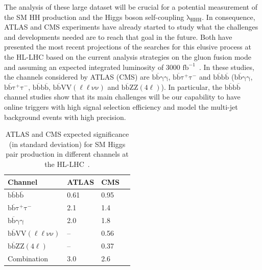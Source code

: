 The analysis of these large dataset will be crucial for a potential measurement of the SM HH production and the Higgs boson self-coupling $\mathrm{\lambda_{HHH}}$. In consequence, ATLAS and CMS experiments have already started to study what the challenges and developments needed are to reach that goal in the future. Both have presented the most recent projections of the searches for this elusive process at the HL-LHC based on the current analysis strategies on the gluon fusion mode and assuming an expected integrated luminosity of 3000 $\mathrm{fb^{-1}}$~\cite{atlasprojections,cmsprojections}. In these studies, the channels considered by ATLAS (CMS) are  $\mathrm{b\overline{b}\gamma\gamma}$, $\mathrm{b\overline{b}\tau^{+}\tau^{-}}$ and  $\mathrm{b\overline{b}b\overline{b}}$  ($\mathrm{b\overline{b}\gamma\gamma}$, $\mathrm{b\overline{b}\tau^{+}\tau^{-}}$, $\mathrm{b\overline{b}b\overline{b}}$, $\mathrm{b\overline{b}VV(\ell\ell\nu\nu)}$ and $\mathrm{b\overline{b}ZZ(4\ell)}$). In particular, the $\mathrm{b\overline{b}b\overline{b}}$ channel studies show that its main challenges will be our capability to have online triggers with high signal selection efficiency and model the multi-jet background events with high precision. 
\begin{table}[htb]
\centering
\caption[ATLAS and CMS expected significance (in standard deviation) for SM Higgs pair production in different channels at the HL-LHC]{\label{tab:significance} ATLAS and CMS expected significance (in standard deviation) for SM Higgs pair production in different channels at the HL-LHC~\cite{yellowreport}. }
\begin{tabularx}{\textwidth}{XXXX}
\hline
Channel                                     & ATLAS  &      CMS  \\
\hline
$\mathrm{b\overline{b}b\overline{b}}$       & 0.61   &  0.95     \\[0pt]
$\mathrm{b\overline{b}\tau^{+}\tau^{-}}$            & 2.1    &  1.4      \\[0pt]
$\mathrm{b\overline{b}\gamma\gamma}$        & 2.0    &  1.8      \\[0pt]
$\mathrm{b\overline{b}VV(\ell\ell\nu\nu)}$  & --     &  0.56     \\[0pt]
 $\mathrm{b\overline{b}ZZ(4\ell)}$          & --     &  0.37     \\[0pt]
Combination                                 & 3.0    &  2.6      \\[0pt]
\hline
\end{tabularx}
\end{table}

